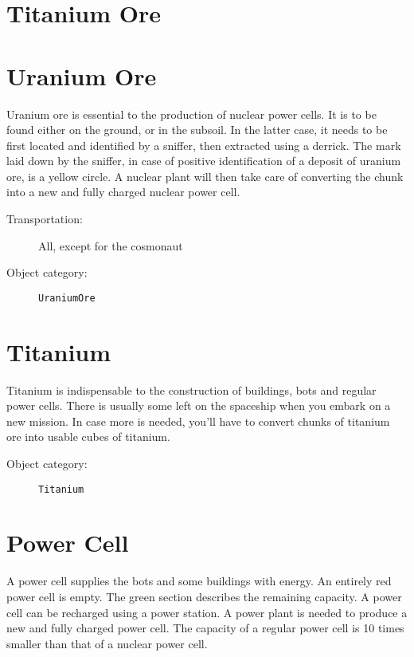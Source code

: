 \section{Titanium Ore}



\section{Uranium Ore}

Uranium ore is essential to the production of nuclear power cells. It is to be found either on the ground, or in the subsoil. In the latter case, it needs to be first located and identified by a sniffer, then extracted using a derrick. The mark laid down by the sniffer, in case of positive identification of a deposit of uranium ore, is a yellow circle. A nuclear plant will then take care of converting the chunk into a new and fully charged nuclear power cell.

\begin{description}
    \item[Transportation:] All, except for the cosmonaut
    \item[Object category:] \texttt{UraniumOre}
\end{description}


\section{Titanium}

Titanium is indispensable to the construction of buildings, bots and regular power cells. There is usually some left on the spaceship when you embark on a new mission. In case more is needed, you'll have to convert chunks of titanium ore into usable cubes of titanium.

\begin{description}
    \item[Object category:] \texttt{Titanium}
\end{description}


\section{Power Cell}

A power cell supplies the bots and some buildings with energy. An entirely red power cell is empty. The green section describes the remaining capacity. A power cell can be recharged using a power station. A power plant is needed to produce a new and fully charged power cell. The capacity of a regular power cell is 10 times smaller than that of a nuclear power cell.

